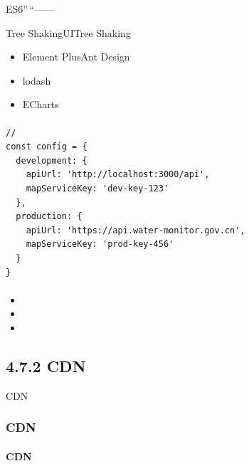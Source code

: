ES6''\,``------

Tree ShakingUITree Shaking

\begin{itemize}
\tightlist
\item
  Element PlusAnt Design
\item
  \important{}lodash
\item
  \important{}ECharts
\end{itemize}

\hypertarget{section-58}{%
\paragraph{}\label{section-58}}

\begin{lstlisting}[style=javascript]
// 
const config = {
  development: {
    apiUrl: 'http://localhost:3000/api',
    mapServiceKey: 'dev-key-123'
  },
  production: {
    apiUrl: 'https://api.water-monitor.gov.cn',
    mapServiceKey: 'prod-key-456'
  }
}
\end{lstlisting}

\hypertarget{section-59}{%
\paragraph{}\label{section-59}}

\important{}

\begin{itemize}
\item
\item
  \important{}
\item
  \important{}
\end{itemize}

\important{}

\hypertarget{cdn}{%
\subsection{4.7.2 CDN}\label{cdn}}

CDN

\hypertarget{cdn-1}{%
\subsubsection{CDN}\label{cdn-1}}


\hypertarget{cdn-2}{%
\paragraph{CDN}\label{cdn-2}}

